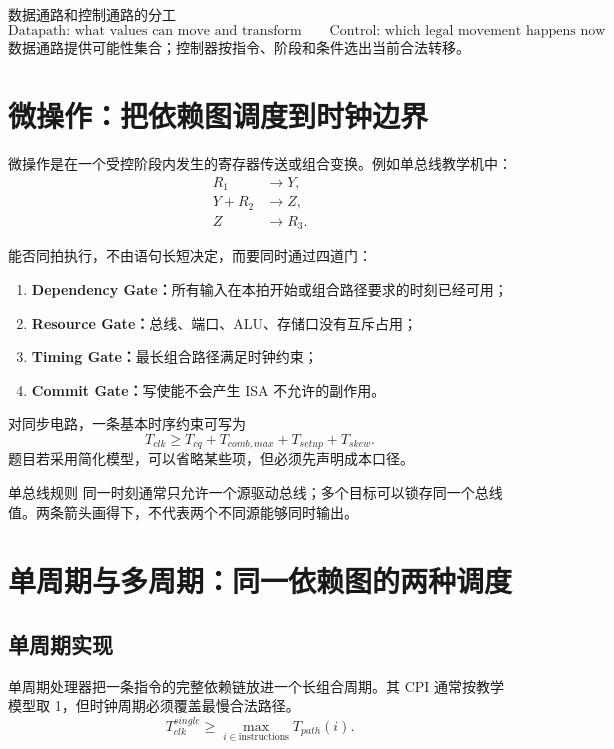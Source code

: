 \documentclass[UTF8,fontset=fandol,11pt,a4paper]{ctexart}
\newcommand{\kw}[1]{\textbf{\color{deep}#1}}
\begin{document}
\begin{corebox}{数据通路和控制通路的分工}
\[
\boxed{
\text{Datapath: what values can move and transform}
\qquad
\text{Control: which legal movement happens now}
}
\]
数据通路提供可能性集合；控制器按指令、阶段和条件选出当前合法转移。
\end{corebox}

\section{微操作：把依赖图调度到时钟边界}

微操作是在一个受控阶段内发生的寄存器传送或组合变换。例如单总线教学机中：
\begin{align*}
R_1 &\to Y,\\
Y+R_2 &\to Z,\\
Z &\to R_3.
\end{align*}

能否同拍执行，不由语句长短决定，而要同时通过四道门：
\begin{enumerate}
  \item \kw{Dependency Gate：}所有输入在本拍开始或组合路径要求的时刻已经可用；
  \item \kw{Resource Gate：}总线、端口、ALU、存储口没有互斥占用；
  \item \kw{Timing Gate：}最长组合路径满足时钟约束；
  \item \kw{Commit Gate：}写使能不会产生 ISA 不允许的副作用。
\end{enumerate}

对同步电路，一条基本时序约束可写为
\[
T_{clk}\ge T_{cq}+T_{comb,max}+T_{setup}+T_{skew}.
\]
题目若采用简化模型，可以省略某些项，但必须先声明成本口径。

\begin{warnbox}{单总线规则}
同一时刻通常只允许一个源驱动总线；多个目标可以锁存同一个总线值。两条箭头画得下，不代表两个不同源能够同时输出。
\end{warnbox}

\section{单周期与多周期：同一依赖图的两种调度}

\subsection{单周期实现}

单周期处理器把一条指令的完整依赖链放进一个长组合周期。其 CPI 通常按教学模型取 1，但时钟周期必须覆盖最慢合法路径。
\[
T_{clk}^{single}\ge\max_{i\in\text{instructions}}T_{path}(i).
\]
\end{document}

